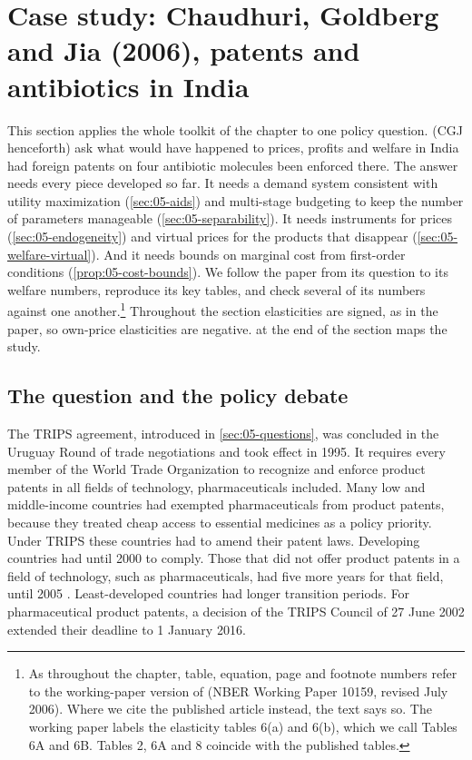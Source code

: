 \section{Case study: Chaudhuri, Goldberg and Jia (2006), patents and antibiotics in India}\label{sec:05-cgj}

This section applies the whole toolkit of the chapter to one policy question. \citet{ChaudhuriGoldbergJia2006}
(CGJ henceforth) ask what would have happened to prices, profits and welfare in India had foreign patents on four
antibiotic molecules been enforced there. The answer needs every piece developed so far. It needs a demand system
consistent with utility maximization (\cref{sec:05-aids}) and multi-stage budgeting to keep the number of parameters
manageable (\cref{sec:05-separability}). It needs instruments for prices (\cref{sec:05-endogeneity}) and virtual
prices for the products that disappear (\cref{sec:05-welfare-virtual}). And it needs bounds on marginal cost from
first-order conditions (\cref{prop:05-cost-bounds}). We follow the paper from its question to its welfare numbers, reproduce its key
tables, and check several of its numbers against one another.\footnote{As throughout the chapter, table, equation,
page and footnote numbers refer to the working-paper version of \citet{ChaudhuriGoldbergJia2006} (NBER Working Paper
10159, revised July 2006). Where we cite the published article instead, the text says so. The working paper labels the elasticity tables 6(a) and 6(b), which we call Tables 6A and
6B. Tables 2, 6A and 8 coincide with the published tables.} Throughout the section elasticities are
signed, as in the paper, so own-price elasticities are negative.  at the end of the
section maps the study.

\subsection{The question and the policy debate}\label{sec:05-cgj-question}

The TRIPS agreement, introduced in \cref{sec:05-questions}, was concluded in the Uruguay Round of trade
negotiations and took effect in 1995. It requires every member of the World Trade Organization to recognize and
enforce product patents in all fields of technology, pharmaceuticals included. Many low and
middle-income countries had exempted pharmaceuticals from product patents, because they treated cheap access to
essential medicines as a policy priority. Under TRIPS these countries had to amend their patent laws. Developing
countries had until 2000 to comply. Those that did not offer product patents in a field of technology, such as
pharmaceuticals, had five more years for that field, until 2005 \citep[p.~105]{DugganGarthwaiteGoyal2016}.
Least-developed countries had longer
transition periods. For pharmaceutical product patents, a decision of the TRIPS Council of 27 June 2002 extended
their deadline to 1 January 2016.

